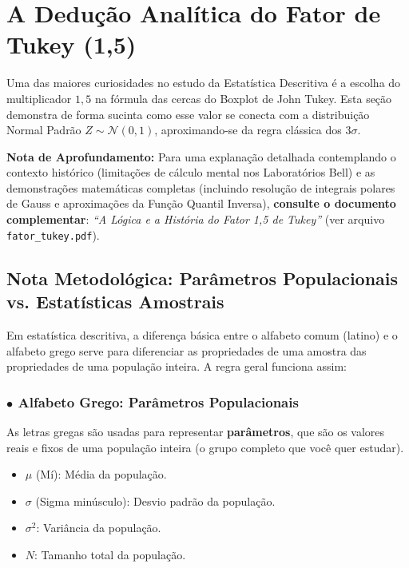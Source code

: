 \documentclass[12pt,a4paper]{article}
\begin{document}
\section{A Dedução Analítica do Fator de Tukey (1,5)}
Uma das maiores curiosidades no estudo da Estatística Descritiva é a escolha do multiplicador $1,5$ na fórmula das cercas do Boxplot de John Tukey. Esta seção demonstra de forma sucinta como esse valor se conecta com a distribuição Normal Padrão $Z \sim \mathcal{N}(0, 1)$, aproximando-se da regra clássica dos $3\sigma$.

\vspace{0.3cm}
\noindent \textbf{Nota de Aprofundamento:} Para uma explanação detalhada contemplando o contexto histórico (limitações de cálculo mental nos Laboratórios Bell) e as demonstrações matemáticas completas (incluindo resolução de integrais polares de Gauss e aproximações da Função Quantil Inversa), \textbf{consulte o documento complementar}: \textit{``A Lógica e a História do Fator 1,5 de Tukey''} (ver arquivo \texttt{fator\_tukey.pdf}).
\vspace{0.3cm}

\subsection{Nota Metodológica: Parâmetros Populacionais vs. Estatísticas Amostrais}
Em estatística descritiva, a diferença básica entre o alfabeto comum (latino) e o alfabeto grego serve para diferenciar as propriedades de uma amostra das propriedades de uma população inteira. A regra geral funciona assim:

\subsubsection*{$\bullet$ Alfabeto Grego: Parâmetros Populacionais}
As letras gregas são usadas para representar \textbf{parâmetros}, que são os valores reais e fixos de uma população inteira (o grupo completo que você quer estudar).
\begin{itemize}
    \item $\mu$ (Mí): Média da população.
    \item $\sigma$ (Sigma minúsculo): Desvio padrão da população.
    \item $\sigma^2$: Variância da população.
    \item $N$: Tamanho total da população.
\end{itemize}
\end{document}
